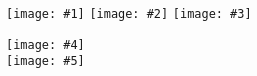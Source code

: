 \documentclass{article}
\newcommand{\generateScheme}[8]{
    \begin{scheme}
        \begin{minipage}{0.5\textwidth} %
            \texttt{[image: \#1]} %
            \texttt{[image: \#2]} %
            \texttt{[image: \#3]} %
        \end{minipage}
        \begin{minipage}{0.5\textwidth} %
            \begin{center}
                \noindent
                \texttt{[image: \#4]} %
                \\[0.5cm]
                \noindent
                \texttt{[image: \#5]} %
            \end{center}
        \end{minipage}
        \caption{Self-assembly of components #6, #7, with #8 in a 2:1:1 molar ratio in CH$_3$CN at 60\textdegree C for 40h.} %
    \end{scheme}
    }
\begin{document}
\generateScheme{chemicalDrawings/8-methoxyquinoline-2-carbaldehyde.png}{chemicalDrawings/(R)-(+)-1,1'-Binaphthyl-2,2'-diamine.png}{chemicalDrawings/Yittrium(III) trifluoromethanesulfonate.png}{nonChemicalDrawings/nmrFail.png}{nonChemicalDrawings/msSuccess.png}{7}{14}{Y(CF$_3$SO$_3$)$_3$}
\end{document}
